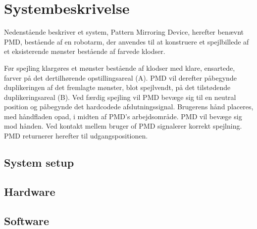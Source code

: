 \chapter{Systembeskrivelse}\label{chap:Systembeskrivelse}
Nedenstående beskriver et system, Pattern Mirroring Device, herefter benævnt PMD, bestående af en
robotarm, der anvendes til at konstruere et spejlbillede af et eksisterende mønster bestående af
farvede klodser.

Før spejling klargøres et mønster bestående af klodser med klare, ensartede, farver på det
dertilhørende opstillingsareal (A).
PMD vil derefter påbegynde duplikeringen af det fremlagte mønster, blot spejlvendt, på det
tilstødende duplikeringsareal (B).
Ved færdig spejling vil PMD bevæge sig til en neutral position og påbegynde det hardcodede
afslutningssignal. Brugerens hånd placeres, med håndfladen opad, i midten af PMD’s
arbejdsområde. PMD vil bevæge sig mod hånden. Ved kontakt
mellem bruger of PMD signalerer korrekt spejlning. PMD returnerer herefter til udgangspositionen.

\section{System setup}\label{sec:SystemSetup}

\section{Hardware}\label{sec:Hardware}

\section{Software}\label{sec:Software}